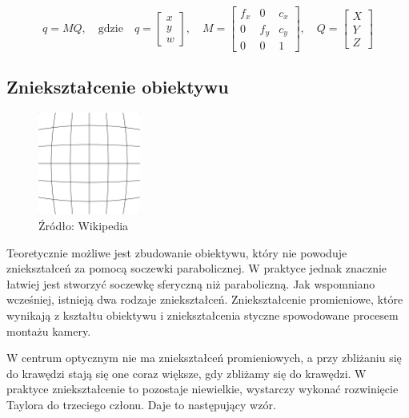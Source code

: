 \documentclass[magisterska]{pracadypl}
\begin{document}
\[
q = MQ, \quad \text{gdzie} \quad
q = \begin{bmatrix} x \\ y \\ w \end{bmatrix}, \quad
M = \begin{bmatrix}
f_x & 0 & c_x \\
0 & f_y & c_y \\
0 & 0 & 1
\end{bmatrix}, \quad
Q = \begin{bmatrix} X \\ Y \\ Z \end{bmatrix}
\]

\subsection{Zniekształcenie obiektywu}

\begin{figure}[h]  %
    \centering  %
    \includegraphics[width=0.3\textwidth]{images/barrel.png}  %
    \captionsetup{labelformat=empty, font=footnotesize}
    \caption{Źródło: Wikipedia}
    \label{fig:rpi}  %
\end{figure}

Teoretycznie możliwe jest zbudowanie obiektywu, który nie powoduje zniekształceń za pomocą soczewki parabolicznej.
W praktyce jednak znacznie łatwiej jest stworzyć soczewkę sferyczną niż paraboliczną.
Jak wspomniano wcześniej, istnieją dwa rodzaje zniekształceń. Zniekształcenie
promieniowe, które wynikają z kształtu obiektywu i zniekształcenia styczne spowodowane procesem montażu kamery.

W centrum optycznym nie ma zniekształceń promieniowych, a przy zbliżaniu się do krawędzi stają się one coraz większe, gdy zbliżamy się do krawędzi. W praktyce zniekształcenie to pozostaje niewielkie, wystarczy wykonać rozwinięcie Taylora do trzeciego członu.
Daje to następujący wzór.
\end{document}
